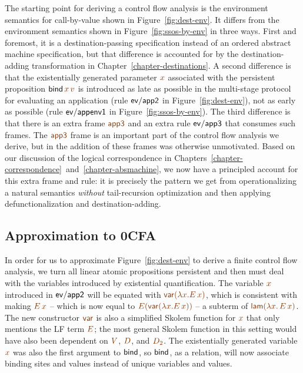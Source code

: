The starting point for deriving a control flow analysis is the
environment semantics for call-by-value shown in
Figure~\ref{fig:dest-env}. It differs from the environment semantics
shown in Figure~\ref{fig:ssos-by-env} in three ways. First and
foremost, it is a destination-passing specification instead of an
ordered abstract machine specification, but that difference is
accounted for by the destination-adding transformation in 
Chapter~\ref{chapter-destinations}.
A second difference is that the existentially generated parameter
$\lf{x}$ associated with the persistent proposition ${\sf
  bind}\,\lf{x}\,\lf{v}$ is introduced as late as possible in the
multi-stage protocol for evaluating an application (rule ${\sf
  ev/app2}$ in Figure~\ref{fig:dest-env}), not as early as possible
(rule ${\sf ev/appenv1}$ in Figure~\ref{fig:ssos-by-env}). The third
difference is that there is an extra frame $\lf{\sf app3}$ and an
extra rule ${\sf ev/app3}$ that consumes such frames. The $\lf{\sf
  app3}$ frame is an important part of the control flow analysis we
derive, but in \cite{simmons11logical} the addition of these frames
was otherwise unmotivated. Based on our discussion of the logical
correspondence in 
Chapters~\ref{chapter-correspondence}~and~\ref{chapter-absmachine}, 
we now have a principled account for this
extra frame and rule: it is precisely the pattern we get from
operationalizing a natural semantics {\it without} tail-recursion
optimization and then applying defunctionalization and destination-adding.

\subsection{Approximation to 0CFA}

In order for us to approximate Figure~\ref{fig:dest-env} to derive a
finite control flow analysis, we turn all linear atomic propositions
persistent and then must deal with the variables introduced by
existential quantification. The variable $\lf{x}$ introduced in ${\sf
  ev/app2}$ will be equated with $\lf{{\sf var}(\lambda x.E\,x)}$,
which is consistent with making $\lf{E\,x}$ -- which is now equal to
$\lf{E({\sf var}(\lambda x.E\,x))}$ -- a subterm of $\lf{{\sf lam}(\lambda x.\, E\,x)}$.  The new
constructor $\lf{\sf var}$ is also a simplified Skolem
function for $\lf{x}$ that only mentions the LF term $\lf{E}$; the
most general Skolem function in this setting would have also been
dependent on $\lf{V}$, $\lf{D}$, and $\lf{D_2}$. The existentially
generated variable $\lf x$ was also the first argument to ${\sf bind}$,
so ${\sf bind}$, as a relation, will now associate binding sites
and values instead of unique variables and values. 

